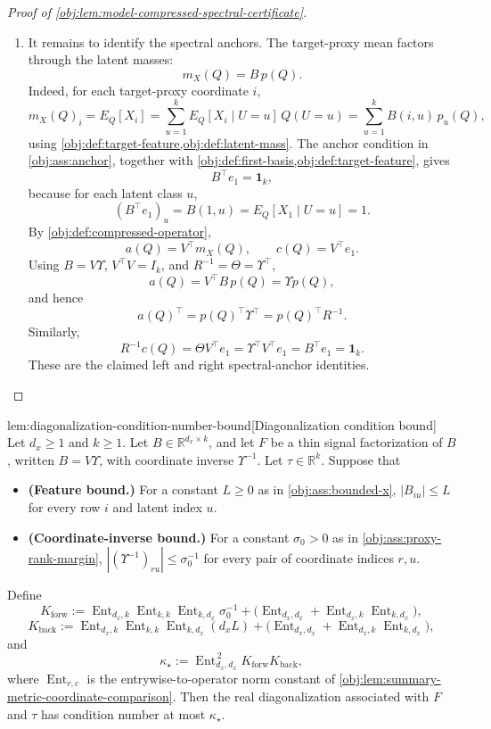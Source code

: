 \documentclass[11pt]{article}
\begin{document}
\begin{proof}[Proof of \cref{obj:lem:model-compressed-spectral-certificate}]
\begin{enumerate}
\item
It remains to identify the spectral anchors.  The target-proxy mean factors through the latent masses:
\[
m_X(Q)=B\,p(Q).
\]
Indeed, for each target-proxy coordinate \(i\),
\[
m_X(Q)_i
=
E_Q[X_i]
=
\sum_{u=1}^k E_Q[X_i\mid U=u]\,Q(U=u)
=
\sum_{u=1}^k B(i,u)\,p_u(Q),
\]
using \cref{obj:def:target-feature,obj:def:latent-mass}.  The anchor condition in \cref{obj:ass:anchor}, together with \cref{obj:def:first-basis,obj:def:target-feature}, gives
\[
B^\top e_1=\mathbf 1_k,
\]
because for each latent class \(u\),
\[
(B^\top e_1)_u=B(1,u)=E_Q[X_1\mid U=u]=1 .
\]
By \cref{obj:def:compressed-operator},
\[
a(Q)=V^\top m_X(Q),
\qquad
c(Q)=V^\top e_1 .
\]
Using \(B=V\Upsilon\), \(V^\top V=I_k\), and \(R^{-1}=\Theta=\Upsilon^\top\),
\[
a(Q)=V^\top B\,p(Q)=\Upsilon p(Q),
\]
and hence
\[
a(Q)^\top=p(Q)^\top\Upsilon^\top=p(Q)^\top R^{-1}.
\]
Similarly,
\[
R^{-1}c(Q)
=
\Theta V^\top e_1
=
\Upsilon^\top V^\top e_1
=
B^\top e_1
=
\mathbf 1_k .
\]
These are the claimed left and right spectral-anchor identities.
\end{enumerate}
\end{proof}

\begin{lemmav}{lem:diagonalization-condition-number-bound}[Diagonalization condition bound]
Let \(d_x\ge 1\) and \(k\ge 1\).  Let \(B\in\mathbb R^{d_x\times k}\), and let \(F\) be a thin signal factorization of \(B\), written \(B=V\Upsilon\), with coordinate inverse \(\Upsilon^{-1}\).  Let \(\tau\in\mathbb R^k\).  Suppose that
\begin{itemize}
\item \textbf{(Feature bound.)} For a constant \(L\ge 0\) as in \cref{obj:ass:bounded-x}, \(|B_{iu}|\le L\) for every row \(i\) and latent index \(u\).
\item \textbf{(Coordinate-inverse bound.)} For a constant \(\sigma_0>0\) as in \cref{obj:ass:proxy-rank-margin}, \(|(\Upsilon^{-1})_{ru}|\le \sigma_0^{-1}\) for every pair of coordinate indices \(r,u\).
\end{itemize}
Define
\[
K_{\mathrm{forw}}
:=
\operatorname{Ent}_{d_x,k}\operatorname{Ent}_{k,k}\operatorname{Ent}_{k,d_x}\sigma_0^{-1}
+
\bigl(\operatorname{Ent}_{d_x,d_x}
+
\operatorname{Ent}_{d_x,k}\operatorname{Ent}_{k,d_x}\bigr),
\]
\[
K_{\mathrm{back}}
:=
\operatorname{Ent}_{d_x,k}\operatorname{Ent}_{k,k}\operatorname{Ent}_{k,d_x}(d_xL)
+
\bigl(\operatorname{Ent}_{d_x,d_x}
+
\operatorname{Ent}_{d_x,k}\operatorname{Ent}_{k,d_x}\bigr),
\]
and
\[
\kappa_\star
:=
\operatorname{Ent}_{d_x,d_x}^{\,2}K_{\mathrm{forw}}K_{\mathrm{back}},
\]
where \(\operatorname{Ent}_{r,c}\) is the entrywise-to-operator norm constant of \cref{obj:lem:summary-metric-coordinate-comparison}.  Then the real diagonalization associated with \(F\) and \(\tau\) has condition number at most \(\kappa_\star\).
\end{lemmav}
\end{document}
